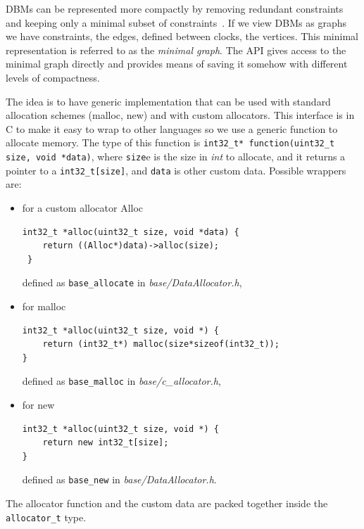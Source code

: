 \documentclass[a4paper]{report}
\begin{document}
DBMs can be represented more compactly by removing redundant
constraints and keeping only a minimal subset of
constraints~\cite{llpw:rtss97}. If we view DBMs as graphs we have
constraints, the edges, defined between clocks, the vertices. This
minimal representation is referred to as the {\em minimal graph}.
The API gives access to the minimal graph directly and provides means
of saving it somehow with different levels of compactness.

The idea is to have generic implementation that can be used with
standard allocation schemes (malloc, new) and with custom
allocators. This interface is in C to make it easy to wrap to other
languages so we use a generic function to allocate memory.  The
type of this function is 
{\tt int32\_t* function(uint32\_t size, void *data)}, where
{\tt size}e is the size in {\em int} to allocate, and it returns a
pointer to a {\tt int32\_t[size]}, and {\tt data} is other custom data.
Possible wrappers are:
\begin{itemize}
\item for a custom allocator Alloc\\
\begin{verbatim}
int32_t *alloc(uint32_t size, void *data) {
    return ((Alloc*)data)->alloc(size);
 }
\end{verbatim}
defined as {\tt base\_allocate} in {\em base/DataAllocator.h},
\item for malloc\\
\begin{verbatim}
int32_t *alloc(uint32_t size, void *) {
    return (int32_t*) malloc(size*sizeof(int32_t));
}
\end{verbatim}
defined as {\tt base\_malloc} in {\em base/c\_allocator.h},
\item for new\\
\begin{verbatim}
int32_t *alloc(uint32_t size, void *) {
    return new int32_t[size];
}
\end{verbatim}
defined as {\tt base\_new} in {\em base/DataAllocator.h}.
\end{itemize}
The allocator function and the custom data are packed
together inside the {\tt allocator\_t} type.
\end{document}
